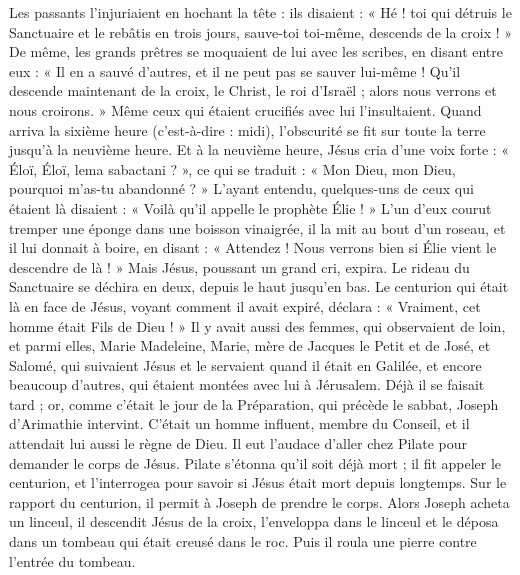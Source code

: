 Les passants l’injuriaient en hochant la tête : ils disaient : « Hé ! toi qui détruis le Sanctuaire et le rebâtis en trois jours,
sauve-toi toi-même, descends de la croix ! »
De même, les grands prêtres se moquaient de lui avec les scribes, en disant entre eux : « Il en a sauvé d’autres, et il ne peut pas se sauver lui-même !
Qu’il descende maintenant de la croix, le Christ, le roi d’Israël ; alors nous verrons et nous croirons. » Même ceux qui étaient crucifiés avec lui l’insultaient.
Quand arriva la sixième heure (c’est-à-dire : midi), l’obscurité se fit sur toute la terre jusqu’à la neuvième heure.
Et à la neuvième heure, Jésus cria d’une voix forte : « Éloï, Éloï, lema sabactani ? », ce qui se traduit : « Mon Dieu, mon Dieu, pourquoi m’as-tu abandonné ? »
L’ayant entendu, quelques-uns de ceux qui étaient là disaient : « Voilà qu’il appelle le prophète Élie ! »
L’un d’eux courut tremper une éponge dans une boisson vinaigrée, il la mit au bout d’un roseau, et il lui donnait à boire, en disant : « Attendez ! Nous verrons bien si Élie vient le descendre de là ! »
Mais Jésus, poussant un grand cri, expira.
Le rideau du Sanctuaire se déchira en deux, depuis le haut jusqu’en bas.
Le centurion qui était là en face de Jésus, voyant comment il avait expiré, déclara : « Vraiment, cet homme était Fils de Dieu ! »
Il y avait aussi des femmes, qui observaient de loin, et parmi elles, Marie Madeleine, Marie, mère de Jacques le Petit et de José, et Salomé,
qui suivaient Jésus et le servaient quand il était en Galilée, et encore beaucoup d’autres, qui étaient montées avec lui à Jérusalem.
Déjà il se faisait tard ; or, comme c’était le jour de la Préparation, qui précède le sabbat,
Joseph d’Arimathie intervint. C’était un homme influent, membre du Conseil, et il attendait lui aussi le règne de Dieu. Il eut l’audace d’aller chez Pilate pour demander le corps de Jésus.
Pilate s’étonna qu’il soit déjà mort ; il fit appeler le centurion, et l’interrogea pour savoir si Jésus était mort depuis longtemps.
Sur le rapport du centurion, il permit à Joseph de prendre le corps.
Alors Joseph acheta un linceul, il descendit Jésus de la croix, l’enveloppa dans le linceul et le déposa dans un tombeau qui était creusé dans le roc. Puis il roula une pierre contre l’entrée du tombeau.
